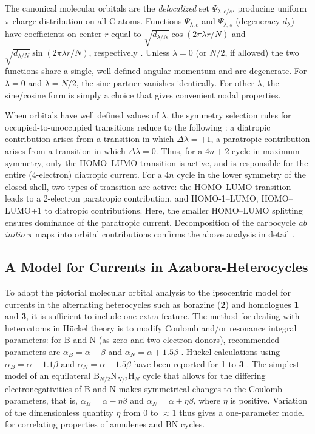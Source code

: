 The canonical molecular orbitals are the \textit{delocalized} set ${\Psi_{\lambda,c/s}}$, producing uniform $\pi$ charge distribution on all C atoms. Functions {$\Psi_{\lambda,c}$} and {$\Psi_{\lambda,s}$} (degeneracy $d_\lambda$) have coefficients on center $r$ equal to $\sqrt{d_{\lambda/N}}\cos(2 \pi \lambda r/N)$ and $\sqrt{d_{\lambda/N}}\sin(2 \pi \lambda r/N)$, respectively \cite{r21}. Unless $\lambda = 0$ (or $N/2$, if allowed) the two functions share a single, well-defined angular momentum and are degenerate. For $\lambda = 0$ and $\lambda = N/2$, the sine partner vanishes identically. For other $\lambda$, the sine/cosine form is simply a choice that gives
convenient nodal properties.

When orbitals have well defined values of $\lambda$, the symmetry selection rules
for occupied-to-unoccupied transitions reduce to the following \cite{r04}: a diatropic contribution arises from a transition in which $\Delta\lambda = +1$, a paratropic contribution arises from a transition in which $\Delta\lambda = 0$. Thus, for a $4n+2$ cycle in maximum symmetry, only the HOMO--LUMO transition is active, and is responsible for the entire (4-electron) diatropic current. For a $4n$ cycle in the lower symmetry of the closed shell, two types of transition are active: the HOMO--LUMO transition leads to a 2-electron paratropic contribution, and HOMO-1--LUMO, HOMO--LUMO+1 to diatropic contributions.  Here, the smaller HOMO--LUMO splitting ensures dominance of the paratropic current. Decomposition of the carbocycle \textit{ab initio} $\pi$ maps into orbital contributions confirms the above analysis in detail \cite{r04}.

\subsection{A Model for Currents in Azabora-Heterocycles}

To adapt the pictorial molecular orbital analysis to the ipsocentric model for currents in the alternating heterocycles
such as borazine (\textbf{2}) and homologues \textbf{1} and \textbf{3}, it is sufficient to include one extra feature.
The method for dealing with heteroatoms in H\"uckel theory is to modify Coulomb and/or resonance integral parameters:
for B and N (as zero and two-electron donors), recommended parameters are $\alpha_B = \alpha -\beta$ and
$\alpha_N = \alpha + 1.5\beta$ \cite{r22a,r22b}. H\"uckel calculations using $\alpha_B = \alpha -1.1\beta$ and
$\alpha_N = \alpha + 1.5\beta$ have been reported for \textbf{1} to \textbf{3} \cite{r16}. The simplest model of an
equilateral B$_{N/2}$N$_{N/2}$H$_N$ cycle that allows for the differing electronegativities of B and N makes symmetrical
changes to the Coulomb parameters, that is, $\alpha_B = \alpha -\eta\beta$ and $\alpha_N = \alpha +\eta\beta$, where 
$\eta$ is positive.  Variation of the dimensionless quantity $\eta$ from $0$ to $\approx 1$ thus gives a one-parameter
model for correlating properties of annulenes and BN cycles.

